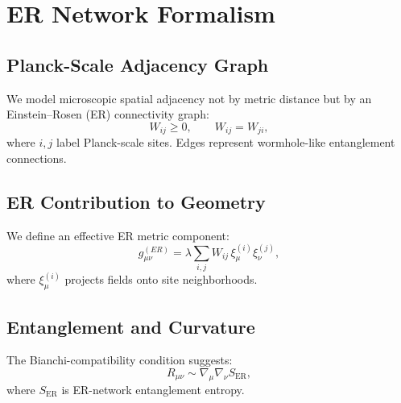 \chapter{ER Network Formalism}

\section{Planck-Scale Adjacency Graph}

We model microscopic spatial adjacency not by metric distance but by 
an Einstein--Rosen (ER) connectivity graph:
\[
W_{ij} \ge 0,\qquad W_{ij}=W_{ji},
\]
where $i,j$ label Planck-scale sites.  
Edges represent wormhole-like entanglement connections.

\section{ER Contribution to Geometry}

We define an effective ER metric component:
\[
g^{(ER)}_{\mu\nu} = \lambda 
\sum_{i,j} W_{ij}\, \xi^{(i)}_\mu \xi^{(j)}_\nu,
\]
where $\xi^{(i)}_\mu$ projects fields onto site neighborhoods.

\section{Entanglement and Curvature}

The Bianchi-compatibility condition suggests:
\[
R_{\mu\nu} \sim \nabla_\mu\nabla_\nu S_{\mathrm{ER}},
\]
where $S_{\mathrm{ER}}$ is ER-network entanglement entropy.


